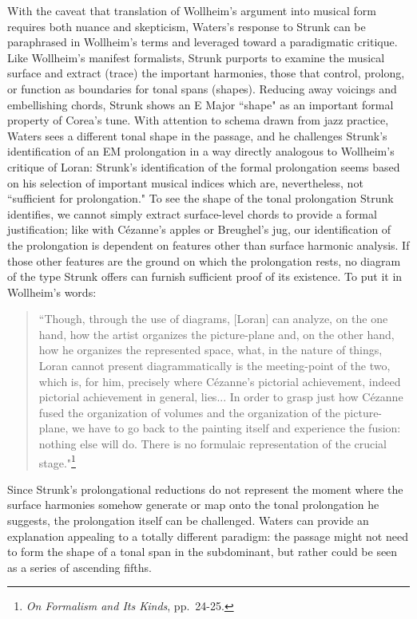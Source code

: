 
With the caveat that translation of Wollheim's argument into musical form requires both nuance and skepticism, Waters's response to Strunk can be paraphrased in Wollheim's terms and leveraged toward a paradigmatic critique.  Like Wollheim's manifest formalists, Strunk purports to examine the musical surface and extract (trace) the important harmonies, those that control, prolong, or function as boundaries for tonal spans (shapes).  Reducing away voicings and embellishing chords, Strunk shows an E Major ``shape" as an important formal property of Corea's tune.  With attention to schema drawn from jazz practice, Waters sees a different tonal shape in the passage, and he challenges Strunk's identification of an EM prolongation in a way directly analogous to Wollheim's critique of Loran: Strunk's identification of the formal prolongation seems based on his selection of important musical indices which are, nevertheless, not ``sufficient for prolongation."  To see the shape of the tonal prolongation Strunk identifies, we cannot simply extract surface-level chords to provide a formal justification; like with C\'{e}zanne's apples or Breughel's jug, our identification of the prolongation is dependent on features other than surface harmonic analysis.  If those other features are the ground on which the prolongation rests, no diagram of the type Strunk offers can furnish sufficient proof of its existence.  To put it in Wollheim's words:
\begin{quote}
``Though, through the use of diagrams, [Loran] can analyze, on the one hand, how the artist organizes the picture-plane and, on the other hand, how he organizes the represented space, what, in the nature of things, Loran cannot present diagrammatically is the meeting-point of the two, which is, for him, precisely where C\'{e}zanne's pictorial achievement, indeed pictorial achievement in general, lies... In order to grasp just how C\'{e}zanne fused the organization of volumes and the organization of the picture-plane, we have to go back to the painting itself and experience the fusion: nothing else will do.  There is no formulaic representation of the crucial stage."\footnote{\emph{On Formalism and Its Kinds}, pp.\ 24-25.}
\end{quote}
Since Strunk's prolongational reductions do not represent the moment where the surface harmonies somehow generate or map onto the tonal prolongation he suggests, the prolongation itself can be challenged.  Waters can provide an explanation appealing to a totally different paradigm: the passage might not need to form the shape of a tonal span in the subdominant, but rather could be seen as a series of ascending fifths.

